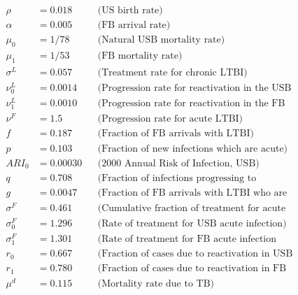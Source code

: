 \documentclass{amsart}
\renewcommand{\(}{\left(}
\renewcommand{\)}{\right)}
\begin{document}
\begin{figure}[h]
  \begin{align*}
    \rho       &= 0.018   && \text{(US birth rate)}\\
    \alpha     &= 0.005   && \text{(FB arrival rate)}\\
    \mu_0      &= 1/78    && \text{(Natural USB mortality rate)}\\
    \mu_1      &= 1/53    && \text{(FB mortality rate)}\\
    \sigma^{L} &= 0.057   &&\text{(Treatment rate for chronic LTBI)}\\
    \nu^{L}_{0}&= 0.0014  &&\text{(Progression rate for reactivation in the USB
                                   population)}\\
    \nu^{L}_{1}&= 0.0010  &&\text{(Progression rate for reactivation in the FB
                                   population)}\\
    \nu^{F}    &= 1.5     &&\text{(Progression rate for acute LTBI)}\\
    f          &= 0.187   &&\text{(Fraction of FB arrivals with LTBI)}\\
    p          &= 0.103   &&\text{(Fraction of new infections which are acute)}\\
    ARI_{0}    &= 0.00030 &&\text{(2000 Annual Risk of Infection, USB)}\\
    q          &= 0.708   &&\text{(Fraction of infections progressing to infectious
                                   disease)}\\
    g          &= 0.0047  &&\text{(Fraction of FB arrivals with LTBI who are fast
                                   progressors)}\\
    \sigma^{F} &= 0.461   &&\text{(Cumulative fraction of treatment for acute
                                   infection)}\\
    \sigma_0^{F} &= 1.296 &&\text{(Rate of treatment for USB acute infection)}\\
    \sigma_1^{F} &= 1.301 &&\text{(Rate of treatment for FB acute infection (per
                                   year))}\\
    r_{0}      &= 0.667   &&\text{(Fraction of cases due to reactivation in USB
                                   population)}\\
    r_{1}      &= 0.780   &&\text{(Fraction of cases due to reactivation in FB
                                   population)}\\
    \mu^{d}    &= 0.115   &&\text{(Mortality rate due to TB)}\\

\end{align*}
\end{figure}
\end{document}
